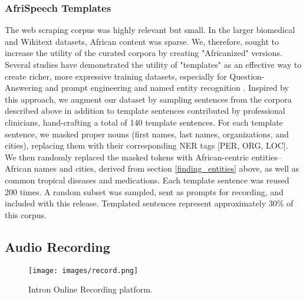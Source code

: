 \documentclass[11pt,a4paper]{article}
\begin{document}
\subsubsection{ AfriSpeech Templates}
 The web scraping corpus was highly relevant but small. In the larger biomedical and Wikitext datasets, African content was sparse. We, therefore, sought to increase the utility of the curated corpora by creating "Africanized" versions. Several studies have demonstrated the utility of "templates" as an effective way to create richer, more expressive training datasets, especially for Question-Answering and prompt engineering \citep{pawar2016question, brown2020language, yao2022prompt} and named entity recognition \citep{DBLP:conf/tsd/DavodyAKK22}. Inspired by this approach, we augment our dataset by sampling sentences from the corpora described above in addition to template sentences contributed by professional clinicians, hand-crafting a total of 140 template sentences. For each template sentence, we masked proper nouns (first names, last names, organizations, and cities), replacing them with their corresponding NER tags [PER, ORG, LOC]. We then randomly replaced the masked tokens with African-centric entities-- African names and cities, derived from section \ref{finding_entities} above, as well as common tropical diseases and medications. Each template sentence was reused 200 times. A random subset was sampled, sent as prompts for recording, and included with this release. Templated sentences represent approximately 30\% of this corpus.
 
 




\subsection{Audio Recording}

\begin{figure}[t]
\texttt{[image: images/record.png]} %
\centering
\caption{Intron Online Recording platform.}
\label{fig:web_app_screen}
\end{figure}
\end{document}
